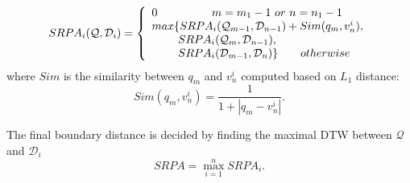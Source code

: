 \documentclass[runningheads,a4paper]{llncs}
\begin{document}
\begin{equation}
\begin{array}{l}
SRPA_i(\mathcal{Q}, \mathcal{D}_i)= \left\{ \begin{array}{l}
 0 \hspace{1.7 cm}m=m_1-1~ or~ n=n_1-1 \\
max\{ SRPA_i(\mathcal{Q}_{m-1},\mathcal{D}_{n-1})+Sim(q_m,v_n^i),  \\
 ~~~~~~~SRPA_i(\mathcal{Q}_{m},\mathcal{D}_{n-1}), \\
 ~~~~~~~SRPA_i(\mathcal{D}_{m-1},\mathcal{D}_{n})\} \hspace{0.7cm} otherwise
 \end{array} \right.
 \end{array}
\label{SRPA}
\end{equation}
where $Sim$ is the similarity between $q_m$ and $v_n^i$ computed based on $L_1$ distance:
\begin{equation}\label{Sim}
  Sim(q_m,v_n^i)=\frac{1}{1+|q_m-v_n^i|}.
\end{equation}

\noindent The final boundary distance is decided by finding the maximal DTW between $\mathcal{Q}$ and $\mathcal{D}_i$
\begin{equation}\label{OverallSRPA}
  SRPA=\max_{i=1}^n SRPA_i.
\end{equation}
\end{document}

